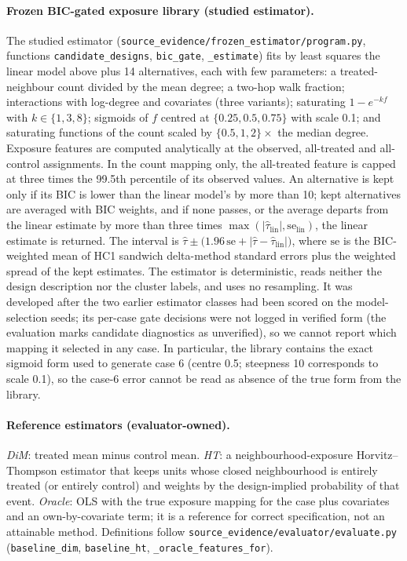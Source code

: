 \documentclass{article}
\begin{document}
\paragraph{Frozen BIC-gated exposure library (studied estimator).} The studied estimator (\texttt{source\_evidence/frozen\_estimator/program.py}, functions \texttt{candidate\_designs}, \texttt{bic\_gate}, \texttt{\_estimate}) fits by least squares the linear model above plus 14 alternatives, each with few parameters: a treated-neighbour count divided by the mean degree; a two-hop walk fraction; interactions with log-degree and covariates (three variants); saturating $1-e^{-kf}$ with $k\in\{1,3,8\}$; sigmoids of $f$ centred at $\{0.25,0.5,0.75\}$ with scale 0.1; and saturating functions of the count scaled by $\{0.5,1,2\}\times$ the median degree. Exposure features are computed analytically at the observed, all-treated and all-control assignments. In the count mapping only, the all-treated feature is capped at three times the 99.5th percentile of its observed values. An alternative is kept only if its BIC is lower than the linear model's by more than 10; kept alternatives are averaged with BIC weights, and if none passes, or the average departs from the linear estimate by more than three times $\max(|\hat\tau_{\mathrm{lin}}|,\mathrm{se}_{\mathrm{lin}})$, the linear estimate is returned. The interval is $\hat\tau\pm\big(1.96\,\mathrm{se}+|\hat\tau-\hat\tau_{\mathrm{lin}}|\big)$, where $\mathrm{se}$ is the BIC-weighted mean of HC1 sandwich delta-method standard errors plus the weighted spread of the kept estimates. The estimator is deterministic, reads neither the design description nor the cluster labels, and uses no resampling. It was developed after the two earlier estimator classes had been scored on the model-selection seeds; its per-case gate decisions were not logged in verified form (the evaluation marks candidate diagnostics as unverified), so we cannot report which mapping it selected in any case. In particular, the library contains the exact sigmoid form used to generate case 6 (centre 0.5; steepness 10 corresponds to scale 0.1), so the case-6 error cannot be read as absence of the true form from the library.

\paragraph{Reference estimators (evaluator-owned).} \emph{DiM}: treated mean minus control mean. \emph{HT}: a neighbourhood-exposure Horvitz--Thompson estimator that keeps units whose closed neighbourhood is entirely treated (or entirely control) and weights by the design-implied probability of that event. \emph{Oracle}: OLS with the true exposure mapping for the case plus covariates and an own-by-covariate term; it is a reference for correct specification, not an attainable method. Definitions follow \texttt{source\_evidence/evaluator/evaluate.py} (\texttt{baseline\_dim}, \texttt{baseline\_ht}, \texttt{\_oracle\_features\_for}).
\end{document}
